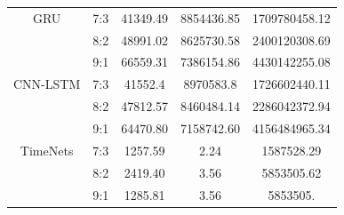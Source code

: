 \documentclass[conference]{IEEEtran}
\begin{document}
\begin{table}[H]
\begin{adjustbox}{width=0.4\textwidth}
\begin{tabular}{|c|c|c|c|c|}
GRU & 7:3 & 41349.49 & 8854436.85 & 1709780458.12 \\
& 8:2 & 48991.02 & 8625730.58 & 2400120308.69 \\
& 9:1 & 66559.31 & 7386154.86 & 4430142255.08 \\ \hline   
CNN-LSTM & 7:3 & 41552.4 & 8970583.8 & 1726602440.11 \\
& 8:2 & 47812.57 & 8460484.14 & 2286042372.94 \\
& 9:1 & 64470.80 & 7158742.60 & 4156484965.34 \\ \hline
TimeNets & 7:3 & 1257.59 & 2.24 & 1587528.29 \\
& 8:2 & 2419.40 & 3.56 & 5853505.62 \\
& 9:1 & 1285.81 & 3.56 & 5853505. \\ \hline
\end{tabular}
\end{adjustbox}
\end{table}
\end{document}
